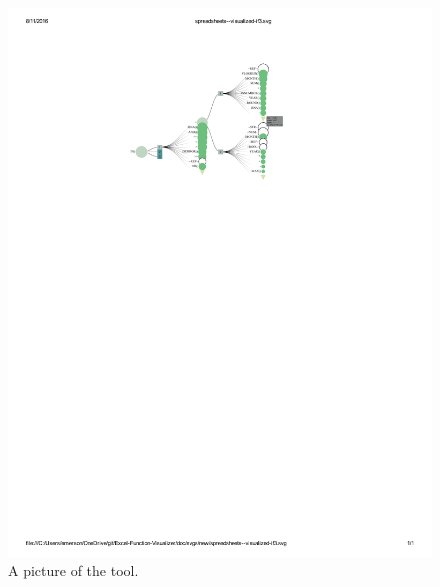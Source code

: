 \documentclass[conference]{IEEEtran}
\begin{document}
\begin{figure}[t]
	\includegraphics[width = \textwidth]{IFargslabel}
	\caption{A picture of the tool.}
	\centering
	\label{fig:fullpic}
\end{figure}
\end{document}
